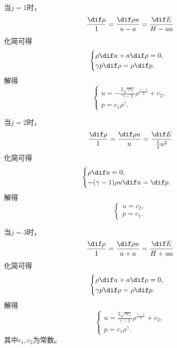 \documentclass[12pt]{article}
\begin{document}
当$j=1$时，
\begin{equation}
	\frac{\dif \rho}{1}=\frac{\dif \rho u}{u-a}=\frac{\dif E}{H-ua}
\end{equation}
化简可得
\begin{equation}
	\begin{cases}
		\rho \dif u+ a\dif \rho=0,\\
		\gamma p\dif \rho=\rho \dif p.
	\end{cases}
\end{equation}
解得
\begin{equation}
	\begin{cases}
		u=-\frac{2\sqrt{\gamma c_1}}{\gamma-1}\rho^{\frac{\gamma-1}{2}}+c_2,\\
		p=c_1\rho^\gamma.
	\end{cases}
\end{equation}

当$j=2$时，
\begin{equation}
	\frac{\dif \rho}{1}=\frac{\dif \rho u}{u}=\frac{\dif E}{\frac{1}{2}u^2}
\end{equation}
化简可得
\begin{equation}
	\begin{cases}
		\rho \dif u=0,\\
		- (\gamma-1) \rho u \dif u= \dif p.
	\end{cases}
\end{equation}
解得
\begin{equation}
	\begin{cases}
		u=c_2,\\
		p=c_1.
	\end{cases}
\end{equation}

当$j=3$时，
\begin{equation}
	\frac{\dif \rho}{1}=\frac{\dif \rho u}{u+a}=\frac{\dif E}{H+ua}
\end{equation}
化简可得
\begin{equation}
	\begin{cases}
		\rho \dif u+ a\dif \rho=0,\\
		\gamma p\dif \rho=\rho \dif p.
	\end{cases}
\end{equation}
解得
\begin{equation}
	\begin{cases}
		u=\frac{2\sqrt{\gamma c_1}}{\gamma-1}\rho^{\frac{\gamma-1}{2}}+c_2,\\
		p=c_1\rho^\gamma.
	\end{cases}
\end{equation}
其中$c_1,c_2$为常数。
\end{document}
